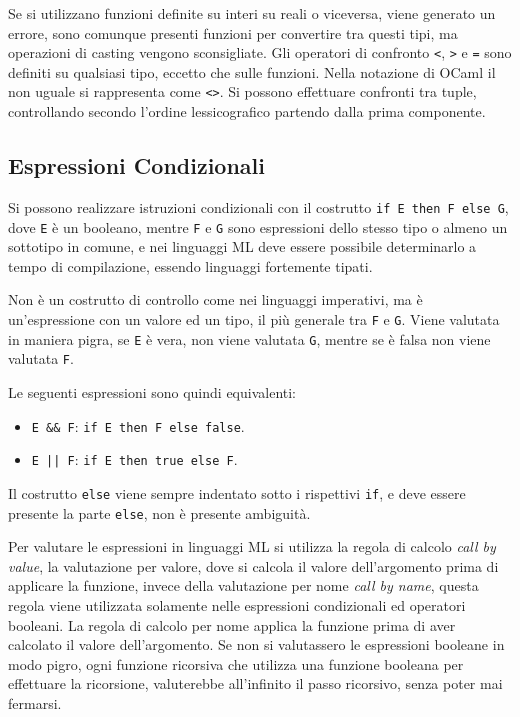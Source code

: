 \documentclass{article}
\numberwithin{equation}{subsection}
\begin{document}
Se si utilizzano funzioni definite su interi su reali o viceversa, viene generato un errore, sono comunque presenti funzioni per convertire tra questi tipi, ma operazioni di casting vengono sconsigliate. 
Gli operatori di confronto \verb|<|, \verb|>| e \verb|=| sono definiti su qualsiasi tipo, eccetto che sulle funzioni. Nella notazione di OCaml il non uguale si rappresenta come \verb|<>|. Si possono effettuare confronti tra tuple, controllando secondo l'ordine lessicografico partendo dalla prima componente. 

\subsection{Espressioni Condizionali}

Si possono realizzare istruzioni condizionali con il costrutto \verb|if E then F else G|, dove \verb|E| è un booleano, mentre \verb|F| e \verb|G| sono espressioni dello stesso tipo o almeno un sottotipo in comune, e nei linguaggi ML deve essere possibile determinarlo a tempo di compilazione, essendo linguaggi fortemente tipati. 

Non è un costrutto di controllo come nei linguaggi imperativi, ma è un'espressione con un valore ed un tipo, il più generale tra \verb|F| e \verb|G|. Viene valutata in maniera pigra, se \verb|E| è vera, non viene valutata \verb|G|, mentre se è falsa non viene valutata \verb|F|. 

Le seguenti espressioni sono quindi equivalenti:
\begin{itemize}
    \item \verb|E && F|: \verb|if E then F else false|.
    \item \texttt{E || F}: \verb|if E then true else F|.
\end{itemize}
Il costrutto \verb|else| viene sempre indentato sotto i rispettivi \verb|if|, e deve essere presente la parte \verb|else|, non è presente ambiguità. 


Per valutare le espressioni in linguaggi ML si utilizza la regola di calcolo \textit{call by value}, la valutazione per valore, dove si calcola il valore dell'argomento prima di applicare la funzione, invece della valutazione per nome \textit{call by name}, questa regola viene utilizzata solamente nelle espressioni condizionali ed operatori booleani. La regola di calcolo per nome applica la funzione prima di aver calcolato il valore dell'argomento. 
Se non si valutassero le espressioni booleane in modo pigro, ogni funzione ricorsiva che utilizza una funzione booleana per effettuare la ricorsione, valuterebbe all'infinito il passo ricorsivo, senza poter mai fermarsi. 
\end{document}
